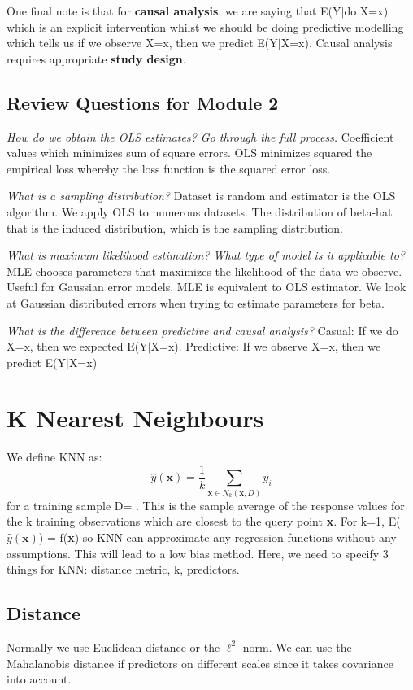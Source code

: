 \documentclass[11pt, oneside]{article}
\def\dataset{\text{$\{(y_i, {\bm{x_i}})\}_{i=1}^N$}}
\theoremstyle{definition}
\begin{document}
One final note is that for \textbf{causal analysis}, we are saying that E(Y$|$do X=x) which is an explicit intervention whilst we should be doing predictive modelling which tells us if we observe X=x, then we predict E(Y$|$X=x). Causal analysis requires appropriate \textbf{study design}.

\subsection{Review Questions for Module 2}
\textit{How do we obtain the OLS estimates? Go through the full process.} Coefficient values which minimizes sum of square errors. OLS minimizes squared the empirical loss whereby the loss function is the squared error loss.

\textit{What is a sampling distribution?} Dataset is random and estimator is the OLS algorithm. We apply OLS to numerous datasets. The distribution of beta-hat that is the induced distribution, which is the sampling distribution.

\textit{What is maximum likelihood estimation? What type of model
is it applicable to?} MLE chooses parameters that maximizes the likelihood of the data we observe. Useful for Gaussian error models. MLE is equivalent to OLS estimator. We look at Gaussian distributed errors when trying to estimate parameters for beta.

\textit{What is the difference between predictive and causal analysis?} Casual: If we do X=x, then we expected E(Y$|$X=x). Predictive: If we observe X=x, then we predict E(Y$|$X=x)

\newpage
\section{K Nearest Neighbours}
We define KNN as:
$$
\hat{y}(\bm{x}) = \frac{1}{k}\sum\limits_{\bm{x} \in N_k(\bm{x},D)}y_i
$$
for a training sample D= \dataset. This is the sample average of the response values for the k training observations which are closest to the query point \textbf{x}. For k=1, E($\hat{y}(\bm{x})$) = f(\textbf{x}) so KNN can approximate any regression functions without any assumptions. This will lead to a low bias method. Here, we need to specify 3 things for KNN: distance metric, k, predictors.
\subsection{Distance}
Normally we use Euclidean distance or the $\ell^2$ norm. We can use the Mahalanobis distance if predictors on different scales since it takes covariance into account.
\end{document}
